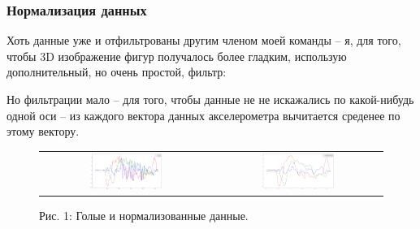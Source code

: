 \subsubsection{Нормализация данных}
Хоть данные уже и отфильтрованы другим членом моей команды – я, для того, чтобы 3D изображение фигур получалось более гладким, использую дополнительный, но очень простой, фильтр:

\begin{figure}[H]
\end{figure}

Но фильтрации мало -- для того, чтобы данные не не искажались по какой-нибудь одной оси -- из каждого вектора данных акселерометра вычитается среденее по этому вектору.

\begin{figure}[H]
    \begin{center}
        \begin{tabular}{cc}
            \includegraphics[width=0.45\textwidth]{sam_images/graph_1.png} & 
            \includegraphics[width=0.45\textwidth]{sam_images/graph_2.png} \\
        \end{tabular}
    \end{center}
    \caption{Рис. 1: Голые и нормализованные данные.}
\end{figure}

